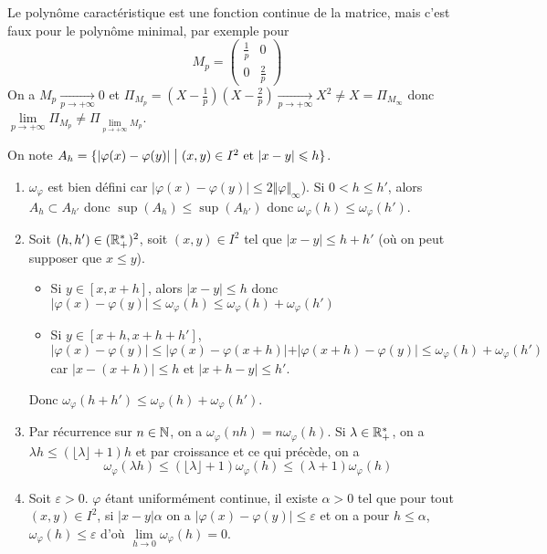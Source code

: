\begin{remark}
	Le polynôme caractéristique est une fonction continue de la matrice, mais c'est faux pour le polynôme minimal, par exemple pour 
	$$M_{p}=\begin{pmatrix}
		\frac{1}{p} &0\\
		0 & \frac{2}{p}
	\end{pmatrix}$$
	On a $M_{p}\xrightarrow[p\to+\infty]{}0$ et $\Pi_{M_{p}}=(X-\frac{1}{p})(X-\frac{2}{p})\xrightarrow[p\to+\infty]{} X^{2}\neq X=\Pi_{M_{\infty}}$ donc $\lim\limits_{p\to+\infty}\Pi_{M_p}\neq\Pi_{\lim\limits_{p\to+\infty}M_{p}}$.
\end{remark}

\begin{solution}
	On note $A_{h}=\{\vert\varphi(x)-\varphi(y)\vert\bigm|(x,y)\in I^{2}\text{ et }\vert x-y\vert\leqslant h\}$.
	\begin{enumerate}
		\item $\omega_{\varphi}$ est bien défini car $\vert\varphi(x)-\varphi(y)\vert\leqslant 2\Vert\varphi\Vert_{\infty}$). Si $0<h\leqslant h'$, alors $A_{h}\subset A_{h'}$ donc $\sup(A_{h})\leqslant\sup(A_{h'})$ donc $\omega_{\varphi}(h)\leqslant\omega_{\varphi}(h')$.
		\item Soit $(h,h')\in(\mathbb{R}_{+}^{*})^{2}$, soit $(x,y)\in I^{2}$ tel que $\vert x-y\vert\leqslant h+h'$ (où on peut supposer que $x\leqslant y$).
		\begin{itemize}
			\item Si $y\in[x,x+h]$, alors $\vert x-y\vert\leqslant h$ donc $\vert\varphi(x)-\varphi(y)\vert\leqslant\omega_{\varphi}(h)\leqslant\omega_\varphi(h)+\omega_{\varphi}(h')$
			\item Si $y\in[x+h,x+h+h']$, $\vert\varphi(x)-\varphi(y)\vert\leqslant\vert\varphi(x)-\varphi(x+h)\vert+\vert\varphi(x+h)-\varphi(y)\vert\leqslant\omega_\varphi(h)+\omega_{\varphi}(h')$ car $\vert x-(x+h)\vert\leqslant h$ et $\vert x+h-y\vert\leqslant h'$.
		\end{itemize}
		Donc $\omega_{\varphi}(h+h')\leqslant\omega_\varphi(h)+\omega_\varphi(h')$.
		\item Par récurrence sur $n\in\mathbb{N}$, on a $\omega_\varphi(nh)=n\omega_\varphi(h)$. Si $\lambda\in\mathbb{R}_{+}^{*}$, on a $\lambda h\leqslant(\lfloor \lambda\rfloor+1)h$ et par croissance et ce qui précède, on a 
		$$\omega_\varphi(\lambda h)\leqslant(\lfloor\lambda\rfloor+1)\omega_\varphi(h)\leqslant(\lambda+1)\omega_\varphi(h)$$
		\item Soit $\varepsilon>0$. $\varphi$ étant uniformément continue, il existe $\alpha>0$ tel que pour tout $(x,y)\in I^{2}$, si $\vert x-y\vert\alpha$ on a $\vert\varphi(x)-\varphi(y)\vert\leqslant\varepsilon$ et on a pour $h\leqslant\alpha$, $\omega_\varphi(h)\leqslant\varepsilon$ d'où $\lim\limits_{h\to0}\omega_\varphi(h)=0$.
		

\end{enumerate}
\end{solution}
